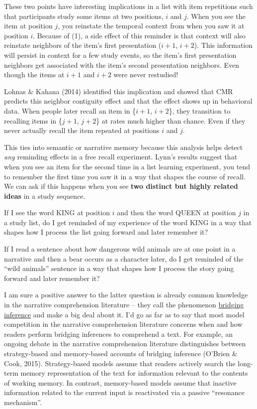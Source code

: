\documentclass[
  english,
  11pt,
  letterpaper,
]{article}
\begin{document}
These two points have interesting implications in a list with item
repetitions such that participants study some items at two positions,
\(i\) and \(j\). When you see the item at position \(j\), you reinstate
the temporal context from when you saw it at position \(i\). Because of
(1), a side effect of this reminder is that context will also reinstate
neighbors of the item's first presentation (\(i+1\), \(i+2\)). This
information will persist in context for a few study events, so the
item's first presentation neighbors get associated with the item's
second presentation neighbors. Even though the items at \(i+1\) and
\(i+2\) were never restudied!

Lohnas \& Kahana (2014) identified this implication and showed that CMR
predicts this neighbor contiguity effect and that the effect shows up in
behavioral data. When people later recall an item in \{\(i+1\),
\(i+2\)\}, they transition to recalling items in \{\(j+1\), \(j+2\)\} at
rates much higher than chance. Even if they never actually recall the
item repeated at positions \(i\) and \(j\).

This ties into semantic or narrative memory because this analysis helps
detect \emph{any} reminding effects in a free recall experiment. Lynn's
results suggest that when you see an item for the second time in a list
learning experiment, you tend to remember the first time you saw it in a
way that shapes the course of recall. We can ask if this happens when
you see \textbf{two distinct but highly related ideas} in a study
sequence.

If I see the word KING at position \(i\) and then the word QUEEN at
position \(j\) in a study list, do I get reminded of my experience of
the word KING in a way that shapes how I process the list going forward
and later remember it?

If I read a sentence about how dangerous wild animals are at one point
in a narrative and then a bear occurs as a character later, do I get
reminded of the ``wild animals'' sentence in a way that shapes how I
process the story going forward and later remember it?

I am sure a positive answer to the latter question is already common
knowledge in the narrative comprehension literature -- they call the
phenomenon
\href{https://en.wikipedia.org/wiki/Text_inferencing\#:~:text=Backward\%20inferences\%20require\%20the\%20reader\%20to\%20bridge\%20the\%20current\%20text\%20idea\%20to\%20one\%20that\%20occurred\%20earlier\%20in\%20the\%20text.}{bridging
inference} and make a big deal about it. I'd go as far as to say that
most model competition in the narrative comprehension literature
concerns when and how readers perform bridging inferences to comprehend
a text. For example, an ongoing debate in the narrative comprehension
literature distinguishes between strategy-based and memory-based
accounts of bridging inference (O'Brien \& Cook, 2015). Strategy-based
models assume that readers actively search the long-term memory
representation of the text for information relevant to the contents of
working memory. In contrast, memory-based models assume that inactive
information related to the current input is reactivated via a passive
``resonance mechanism''.
\end{document}
